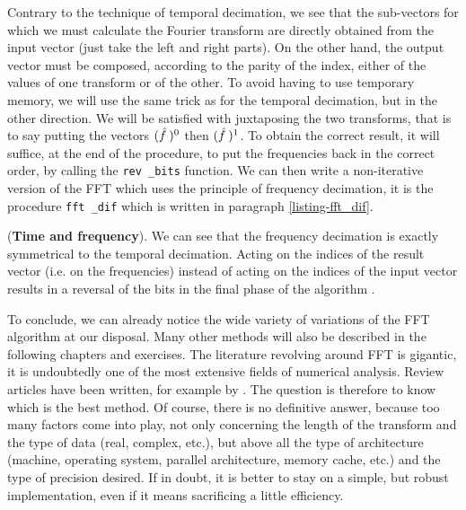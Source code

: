  
 
Contrary to the technique of temporal decimation, we see that the sub-vectors for which we must calculate the Fourier transform are directly obtained from the input vector (just take the left and right parts). On the other hand, the output vector must be composed, according to the parity of the index, either of the values of one transform or of the other. To avoid having to use temporary memory, we will use the same trick as for the temporal decimation, but in the other direction. We will be satisfied with juxtaposing the two transforms, that is to say putting the vectors $ (\hat{f} \:)^0 $ then $ (\hat{f} \:)^1 $. To obtain the correct result, it will suffice, at the end of the procedure, to put the frequencies back in the correct order, by calling the \texttt{rev \_bits} function. We can then write a non-iterative version of the FFT which uses the principle of frequency decimation, it is the procedure \texttt{fft \_dif} which is written in paragraph \ref{listing-fft_dif}.
 
\begin{rem}{(\upshape \textbf{Time and frequency}).} 
We can see that the frequency decimation is exactly symmetrical to the temporal decimation. Acting on the indices of the result vector (i.e. on the frequencies) instead of acting on the indices of the input vector results in a reversal of the bits in the final phase of the algorithm .
\end{rem}
 
 
 
To conclude, we can already notice the wide variety of variations of the FFT algorithm at our disposal. Many other methods will also be described in the following chapters and exercises. The literature revolving around FFT is gigantic, it is undoubtedly one of the most extensive fields of numerical analysis. Review articles have been written, for example by  \cite{burrus-fft}. The question is therefore to know which is the best method. Of course, there is no definitive answer, because too many factors come into play, not only concerning the length of the transform and the type of data (real, complex, etc.), but above all the type of architecture (machine, operating system, parallel architecture, memory cache, etc.) and the type of precision desired. If in doubt, it is better to stay on a simple, but robust implementation, even if it means sacrificing a little efficiency.
